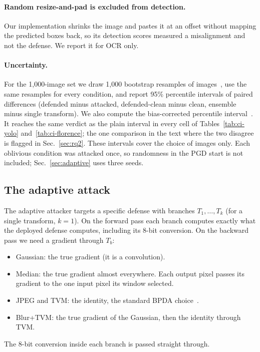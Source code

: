 \documentclass[11pt]{article}
\begin{document}
\paragraph{Random resize-and-pad is excluded from detection.} Our
implementation shrinks the image and pastes it at an offset without mapping
the predicted boxes back, so its detection scores measured a misalignment and
not the defense. We report it for OCR only.

\paragraph{Uncertainty.} For the 1{,}000-image set we draw 1{,}000 bootstrap
resamples of images~\cite{efron1993introduction}, use the same resamples for
every condition, and report 95\% percentile intervals of paired differences
(defended minus attacked, defended-clean minus clean, ensemble minus
single transform). We also compute the bias-corrected percentile
interval~\cite{efron1993introduction}. It reaches the same verdict as the
plain interval in every cell of Tables~\ref{tab:ci-yolo}
and~\ref{tab:ci-florence}; the one comparison in the text where the two
disagree is flagged in Sec.~\ref{sec:rq2}. These intervals cover the choice
of images only. Each
oblivious condition was attacked once, so randomness in the PGD start is not
included; Sec.~\ref{sec:adaptive} uses three seeds.

\subsection{The adaptive attack}
\label{sec:adaptive-method}

The adaptive attacker targets a specific defense with branches
$T_1,\dots,T_k$ (for a single transform, $k=1$). On the forward pass each
branch computes exactly what the deployed defense computes, including its
8-bit conversion. On the backward pass we need a gradient through $T_b$:
\begin{itemize}
\item Gaussian: the true gradient (it is a convolution).
\item Median: the true gradient almost everywhere. Each output pixel passes
its gradient to the one input pixel its window selected.
\item JPEG and TVM: the identity, the standard BPDA
choice~\cite{athalye2018obfuscated}.
\item Blur+TVM: the true gradient of the Gaussian, then the identity through
TVM.
\end{itemize}
The 8-bit conversion inside each branch is passed straight through.
\end{document}
